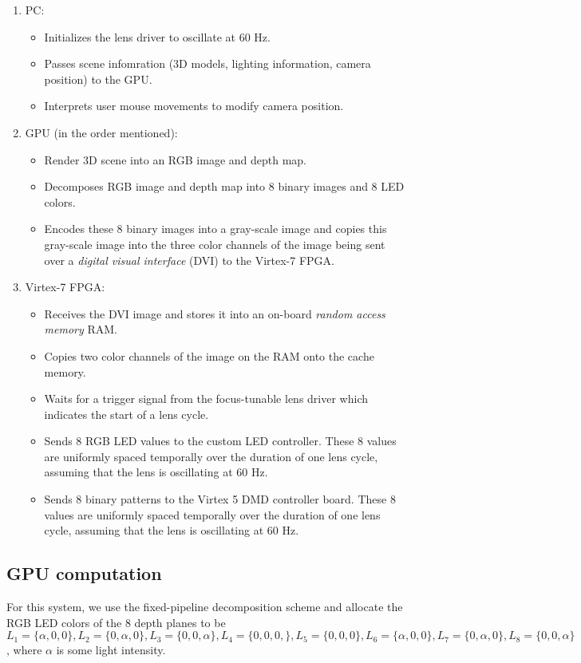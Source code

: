 \begin{enumerate}
    \item PC:
    \begin{itemize}
        \item Initializes the lens driver to oscillate at 60 Hz. 
        \item Passes scene infomration (3D models, lighting information, camera position) to the GPU.
        \item Interprets user mouse movements to modify camera position.
    \end{itemize}
    \item GPU (in the order mentioned):
    \begin{itemize}
        \item Render 3D scene into an RGB image and depth map.
        \item Decomposes RGB image and depth map into 8 binary images and 8 LED colors.
        \item Encodes these 8 binary images into a gray-scale image and copies this gray-scale image into the three color channels of the image being sent over a \emph{digital visual interface} (DVI) to the Virtex-7 FPGA.
    \end{itemize}
    \item Virtex-7 FPGA:
    \begin{itemize}
        \item Receives the DVI image and stores it into an on-board \emph{random access memory} RAM.
        \item Copies two color channels of the image on the RAM onto the cache memory.
        \item Waits for a trigger signal from the focus-tunable lens driver which indicates the start of a lens cycle.
        \item Sends 8 RGB LED values to the custom LED controller. These 8 values are uniformly spaced temporally over the duration of one lens cycle, assuming that the lens is oscillating at 60 Hz.
        \item Sends 8 binary patterns to the Virtex 5 DMD controller board. These 8 values are uniformly spaced temporally over the duration of one lens cycle, assuming that the lens is oscillating at 60 Hz.
    \end{itemize}
\end{enumerate}

\subsection{GPU computation}

For this system, we use the fixed-pipeline decomposition scheme and allocate the RGB LED colors of the 8 depth planes to be $L_1 = \{\alpha, 0, 0\}, L_2 = \{0, \alpha, 0\}, L_3 = \{0, 0, \alpha\}, L_4 = \{0, 0, 0,\}, L_5 = \{0, 0, 0\}, L_6 = \{\alpha, 0,0\}, L_7 = \{0, \alpha,0\}, L_8 = \{0, 0, \alpha\}$, where $\alpha$ is some light intensity.

